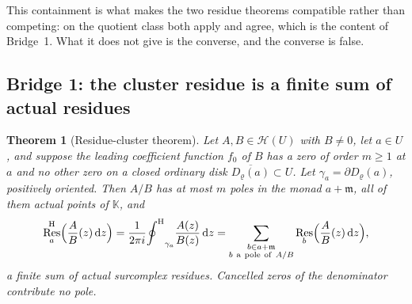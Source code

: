 \documentclass[11pt,a4paper]{article}
\numberwithin{equation}{section}
\newtheorem{theorem}{Theorem}[section]
\theoremstyle{definition}
\theoremstyle{remark}
\theoremstyle{plain}
\newcommand{\K}{\mathbb K}
\newcommand{\mm}{\mathfrak m}
\newcommand{\Hc}{\mathcal H}
\newcommand{\ointH}{{\oint^{\mathrm H}}}
\DeclareMathOperator{\Res}{Res}                 %
\newcommand{\ResH}[1]{\Res^{\mathrm H}_{#1}}    %
\newcommand{\Resat}[1]{\Res_{#1}}               %
\newcommand{\dd}{\mathrm d}
\begin{document}
This containment is what makes the two residue theorems compatible
rather than competing: on the quotient class both apply and agree,
which is the content of Bridge~1.  What it does not give is the
converse, and the converse is false.

\subsection{Bridge 1: the cluster residue is a finite sum of actual residues}
\label{d:sub:bridge1}

\begin{theorem}[Residue-cluster theorem]
\label{d:thm:bridge1}
Let $A,B\in\Hc(U)$ with $B\ne0$, let $a\in U$, and suppose the leading
coefficient function $f_0$ of $B$ has a zero of order $m\ge1$ at $a$ and
no other zero on a closed ordinary disk $\overline{D_\varrho(a)}\subset U$.
Let $\gamma_a=\partial D_\varrho(a)$, positively oriented.  Then $A/B$
has at most $m$ poles in the monad $a+\mm$, all of them actual points of
$\K$, and
\begin{equation}\label{d:eq:bridge1}
 \ResH{a}\Bigl(\frac{A}{B}(z)\,\dd z\Bigr)
 =\frac1{2\pi i}\ointH_{\gamma_a}\frac{A(z)}{B(z)}\,\dd z
 =\sum_{\substack{b\in a+\mm\\ b\ \mathrm{a\ pole\ of}\ A/B}}
    \Resat{b}\Bigl(\frac{A}{B}(z)\,\dd z\Bigr),
\end{equation}
a \emph{finite} sum of actual surcomplex residues.  Cancelled zeros of
the denominator contribute no pole.
\end{theorem}
\end{document}
